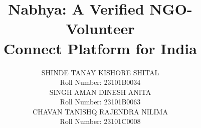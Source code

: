 \newcommand{\seqfigure}[5]{%
  \begin{figure}[H]\centering
  \imgph{\textwidth}{#5}{#1.png}
  \caption{#3}\label{#4}
  \end{figure}}


\setlength{\headheight}{14pt}
\pagestyle{fancy}
\fancyhf{}
\renewcommand{\headrulewidth}{0pt}

\cleardoublepage
{}

\title{\LARGE Nabhya: A Verified NGO-Volunteer\\Connect Platform for India}
\author{SHINDE TANAY KISHORE SHITAL\\
        {\normalfont\normalsize Roll Number: 23101B0034}\\[0.12in]
        SINGH AMAN DINESH ANITA\\
        {\normalfont\normalsize Roll Number: 23101B0063}\\[0.12in]
        CHAVAN TANISHQ RAJENDRA NILIMA\\
        {\normalfont\normalsize Roll Number: 23101C0008}}
\date{}
\maketitle

